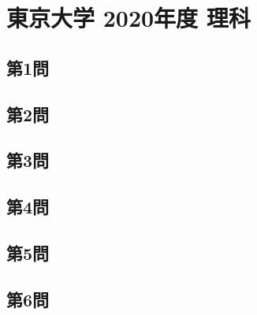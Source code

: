 ﻿\documentclass[../../uem_tok_q.tex]{subfiles}
\begin{document}
    \section{東京大学 2020年度 理科}

    \subsection{第1問}
    

    \vfill
    \subsection{第2問}
    

    \vfill
    \newpage
    \subsection{第3問}
    

    \vfill
    \subsection{第4問}
    

    \vfill
    \newpage
    \subsection{第5問}
    

    \vfill
    \subsection{第6問}
    

    \vfill
\end{document}

